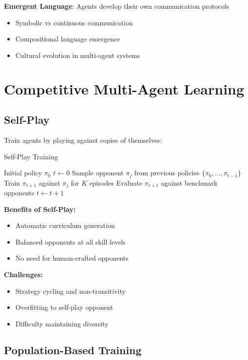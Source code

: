 \textbf{Emergent Language}: Agents develop their own communication protocols
\begin{itemize}
    \item Symbolic vs continuous communication
    \item Compositional language emergence
    \item Cultural evolution in multi-agent systems
\end{itemize}

\section{Competitive Multi-Agent Learning}

\subsection{Self-Play}

Train agents by playing against copies of themselves:

\begin{algorithm}
\caption{Self-Play Training}
\begin{algorithmic}
\REQUIRE Initial policy $\pi_0$
\STATE $t \leftarrow 0$
    \STATE Sample opponent $\pi_j$ from previous policies $\{\pi_0, \ldots, \pi_{t-1}\}$
    \STATE Train $\pi_{t+1}$ against $\pi_j$ for $K$ episodes
    \STATE Evaluate $\pi_{t+1}$ against benchmark opponents
    \STATE $t \leftarrow t + 1$
\ENDWHILE
\end{algorithmic}
\end{algorithm}

\textbf{Benefits of Self-Play:}
\begin{itemize}
    \item Automatic curriculum generation
    \item Balanced opponents at all skill levels
    \item No need for human-crafted opponents
\end{itemize}

\textbf{Challenges:}
\begin{itemize}
    \item Strategy cycling and non-transitivity
    \item Overfitting to self-play opponent
    \item Difficulty maintaining diversity
\end{itemize}

\subsection{Population-Based Training}


